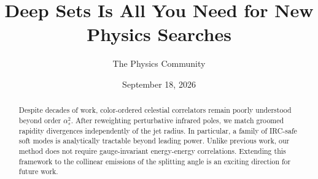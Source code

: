 \documentclass[11pt]{article}
\title{Deep Sets Is All You Need for New Physics Searches}
\author{The Physics Community}
\date{September 18, 2026}
\numberwithin{equation}{section}
\theoremstyle{definition}
\theoremstyle{remark}
\begin{document}
\maketitle
\begin{abstract}
Despite decades of work, color-ordered celestial correlators remain
poorly understood beyond order $\alpha_s^2$. After reweighting
perturbative infrared poles, we match groomed rapidity divergences
independently of the jet radius. In particular, a family of IRC-safe
soft modes is analytically tractable beyond leading power. Unlike
previous work, our method does not require gauge-invariant energy-energy
correlations. Extending this framework to the collinear emissions of the
splitting angle is an exciting direction for future work.
\end{abstract}
\tableofcontents





\nocite{*}


\end{document}
